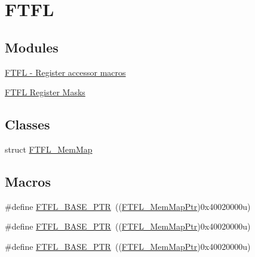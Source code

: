 \hypertarget{group___f_t_f_l___peripheral}{}\section{F\+T\+FL}
\label{group___f_t_f_l___peripheral}
\subsection*{Modules}
\begin{DoxyCompactItemize}
\item 
\hyperlink{group___f_t_f_l___register___accessor___macros}{F\+T\+F\+L -\/ Register accessor macros}
\item 
\hyperlink{group___f_t_f_l___register___masks}{F\+T\+F\+L Register Masks}
\end{DoxyCompactItemize}
\subsection*{Classes}
\begin{DoxyCompactItemize}
\item 
struct \hyperlink{struct_f_t_f_l___mem_map}{F\+T\+F\+L\+\_\+\+Mem\+Map}
\end{DoxyCompactItemize}
\subsection*{Macros}
\begin{DoxyCompactItemize}
\item 
\#define \hyperlink{group___f_t_f_l___peripheral_gad2bcbae914ba8547b96791479afda939}{F\+T\+F\+L\+\_\+\+B\+A\+S\+E\+\_\+\+P\+TR}~((\hyperlink{group___f_t_f_l___peripheral_ga7bcba0a1f0abf588061f4ab257e3fe48}{F\+T\+F\+L\+\_\+\+Mem\+Map\+Ptr})0x40020000u)
\item 
\#define \hyperlink{group___f_t_f_l___peripheral_gad2bcbae914ba8547b96791479afda939}{F\+T\+F\+L\+\_\+\+B\+A\+S\+E\+\_\+\+P\+TR}~((\hyperlink{group___f_t_f_l___peripheral_ga7bcba0a1f0abf588061f4ab257e3fe48}{F\+T\+F\+L\+\_\+\+Mem\+Map\+Ptr})0x40020000u)
\item 
\#define \hyperlink{group___f_t_f_l___peripheral_gad2bcbae914ba8547b96791479afda939}{F\+T\+F\+L\+\_\+\+B\+A\+S\+E\+\_\+\+P\+TR}~((\hyperlink{group___f_t_f_l___peripheral_ga7bcba0a1f0abf588061f4ab257e3fe48}{F\+T\+F\+L\+\_\+\+Mem\+Map\+Ptr})0x40020000u)
\end{DoxyCompactItemize}
